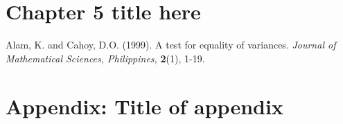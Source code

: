 \documentclass{BGSU}
\numberwithin{equation}{chapter}
\begin{document}
\chapter{Chapter 5 title here}



\backmatter


\mbox{}\newpage\mbox{}
\begin{thebibliography}{99}

\bibitem{} Alam, K. and Cahoy, D.O. (1999). A test for equality of
variances. \textit{Journal of Mathematical Sciences, Philippines,} {\bf{2}}(1), 1-19.

\end{thebibliography}
\mbox{}\newpage
{}
\appendix
\chapter{Appendix: Title of appendix}

\end{document}
